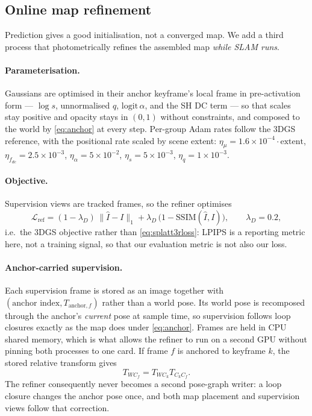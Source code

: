 \subsection{Online map refinement}
\label{sec:method:refiner}

Prediction gives a good initialisation, not a converged map. We add a third
process that photometrically refines the assembled map \emph{while SLAM runs}.

\paragraph{Parameterisation.}
Gaussians are optimised in their anchor keyframe's local frame in
pre-activation form --- $\log s$, unnormalised $q$, $\mathrm{logit}\,\alpha$,
and the SH DC term --- so that scales stay positive and opacity stays in
$(0,1)$ without constraints, and composed to the world by
\cref{eq:anchor} at every step. Per-group Adam rates follow the 3DGS
reference, with the positional rate scaled by scene extent:
$\eta_\mu = 1.6\!\times\!10^{-4}\!\cdot\!\mathrm{extent}$,
$\eta_{f_{dc}} = 2.5\!\times\!10^{-3}$, $\eta_\alpha = 5\!\times\!10^{-2}$,
$\eta_s = 5\!\times\!10^{-3}$, $\eta_q = 1\!\times\!10^{-3}$.

\paragraph{Objective.}
Supervision views are tracked frames, so the refiner optimises
\begin{equation}
\mathcal{L}_{\text{ref}} = (1-\lambda_{D})\,\lVert \hat{I}-I \rVert_1
                          + \lambda_{D}\,\bigl(1-\mathrm{SSIM}(\hat{I},I)\bigr),
\qquad \lambda_{D}=0.2 ,
\label{eq:refloss}
\end{equation}
i.e.\ the 3DGS objective rather than \cref{eq:splatt3rloss}: LPIPS is a
reporting metric here, not a training signal, so that our evaluation metric is
not also our loss.

\paragraph{Anchor-carried supervision.}
Each supervision frame is stored as an image together with
$(\text{anchor index}, T_{\text{anchor},f})$ rather than a world pose. Its
world pose is recomposed through the anchor's \emph{current} pose at sample
time, so supervision follows loop closures exactly as the map does under
\cref{eq:anchor}. Frames are held in CPU shared memory, which is what allows
the refiner to run on a second GPU without pinning both processes to one card.
If frame $f$ is anchored to keyframe $k$, the stored relative transform gives
\begin{equation}
T_{WC_f}=T_{WC_k}T_{C_kC_f}.
\label{eq:supervisionpose}
\end{equation}
The refiner consequently never becomes a second pose-graph writer: a loop
closure changes the anchor pose once, and both map placement and supervision
views follow that correction.

